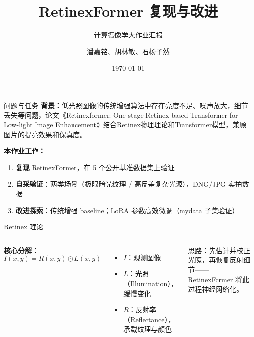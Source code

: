 \documentclass{beamer}
\title{RetinexFormer 复现与改进}
\subtitle{计算摄像学大作业汇报}
\author{潘嘉铭、胡林敏、石杨子然}
\date{\today}
\begin{document}
\maketitle

\begin{frame}{问题与任务}
  \textbf{背景：}低光照图像的传统增强算法中存在亮度不足、噪声放大，细节丢失等问题，论文《Retinexformer: One-stage Retinex-based
  Transformer for Low-light Image Enhancement》结合Retinex物理理论和Transformer模型，兼顾图片的提亮效果和保真度。

  \vspace{0.6em}
  \textbf{本作业工作：}
  \begin{enumerate}
    \item \textbf{复现} RetinexFormer，在 5 个公开基准数据集上验证
    \item \textbf{自采验证}：两类场景（极限暗光纹理 / 高反差复杂光源），DNG/JPG 实拍数据
    \item \textbf{改进探索}：传统增强 baseline；LoRA 参数高效微调（mydata 子集验证）
  \end{enumerate}
\end{frame}

\begin{frame}{Retinex 理论}
  \begin{columns}[T]
    \textbf{核心分解：}
    \[
      I(x,y) = R(x,y) \odot L(x,y)
    \]
    \begin{itemize}
      \item $I$：观测图像
      \item $L$：光照（Illumination），缓慢变化
      \item $R$：反射率（Reflectance），承载纹理与颜色
    \end{itemize}
    \vspace{0.5em}
    \small 思路：先估计并校正光照，再恢复反射细节——RetinexFormer 将此过程神经网络化。

    \centering
  \end{columns}
\end{frame}
\end{document}
